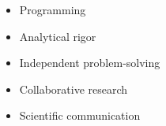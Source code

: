 \twocolumnsection
{
    \begin{skills}    
    \end{skills}}
{
    \vspace{1.2em}
    \begin{itemize}
        \item Programming
        \item Analytical rigor
        \item Independent problem-solving
        \item Collaborative research
        \item Scientific communication
    \end{itemize}
}